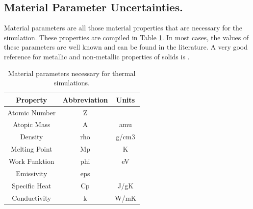 \subsection{Material Parameter Uncertainties.}

Material parameters are all those material properties that are necessary for the simulation. These properties are compiled in Table \ref{tab:MaterialProp}. In most cases, the values of these parameters are well known and can be found in the literature. A very good reference for metallic and non-metallic properties of solids is \parencite[][]{ref:MatProperties}.  

\begin{table}[h]
    \centering
    \begin{tabular}{ccc}
    \hline
    \textbf{Property} & \textbf{Abbreviation} & \textbf{Units} \\ \hline
    Atomic Number     & Z                     &                \\
    Atopic Mass       & A                     & amu            \\
    Density           & rho                   & g/cm3          \\
    Melting Point     & Mp                    & K              \\
    Work Funktion     & phi                   & eV             \\
    Emissivity        & eps                   &                \\
    Specific Heat     & Cp                    & J/gK           \\
    Conductivity      & k                     & W/mK           \\ \hline
    \end{tabular}
    \caption{Material parameters necessary for thermal simulations.}
    \label{tab:MaterialProp}
\end{table}

